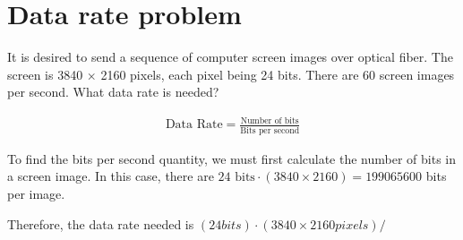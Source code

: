 
\section{Data rate problem}
It is desired to send a sequence of computer screen images over optical fiber. The screen is 3840 $\times$ 2160 pixels, each pixel being 24 bits. There are 60 screen images per second. What data rate is needed?

\begin{align*}
	\text{Data Rate} = \frac{\text{Number of bits}}{\text{Bits per second}}
\end{align*}

To find the bits per second quantity, we must first calculate the number of bits in a screen image. In this case, there are $24 \text{ bits} \cdot (3840 \times 2160) = 199065600$ bits per image.

Therefore, the data rate needed is $(24 bits) \cdot (3840 \times 2160 pixels) / $

\section{}
\section{}
\section{}
\section{}
\section{}
\section{}
